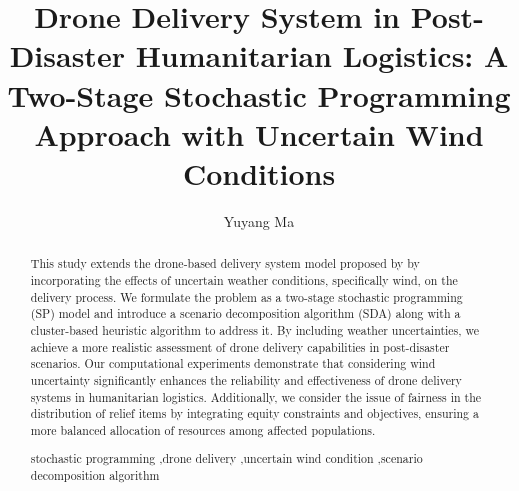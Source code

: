 \documentclass[preprint,review,11pt,authoryear]{elsarticle}
\begin{document}
\begin{frontmatter}

\title{Drone Delivery System in Post-Disaster Humanitarian Logistics: A Two-Stage Stochastic Programming Approach with Uncertain Wind Conditions}


\author[mymainaddress1]{Yuyang Ma}
\address[mymainaddress1]{Department of Industrial and Systems Engineering, Lehigh University, Bethlehem, PA,  USA}



\begin{abstract}
\noindent This study extends the drone-based delivery system model proposed by \cite{dukkanci2023drones} by incorporating the effects of uncertain weather conditions, specifically wind, on the delivery process. We formulate the problem as a two-stage stochastic programming (SP) model and introduce a scenario decomposition algorithm (SDA) along with a cluster-based heuristic algorithm to address it. By including weather uncertainties, we achieve a more realistic assessment of drone delivery capabilities in post-disaster scenarios. Our computational experiments demonstrate that considering wind uncertainty significantly enhances the reliability and effectiveness of drone delivery systems in humanitarian logistics. Additionally, we consider the issue of fairness in the distribution of relief items by integrating equity constraints and objectives, ensuring a more balanced allocation of resources among affected populations. 

\begin{keyword} 
stochastic programming \sep drone delivery \sep uncertain wind condition \sep scenario decomposition algorithm 
\end{keyword}

\end{abstract}
\end{frontmatter}
\end{document}
